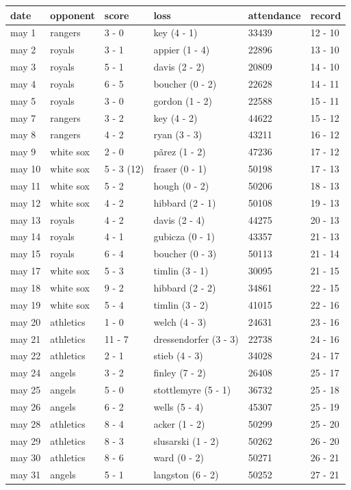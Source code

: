 \documentclass{article}
\begin{document}
\begin{tabular}{llllll}
\toprule
date & opponent & score & loss & attendance & record \\
\midrule
may 1 & rangers & 3 - 0 & key (4 - 1) & 33439 & 12 - 10 \\
may 2 & royals & 3 - 1 & appier (1 - 4) & 22896 & 13 - 10 \\
may 3 & royals & 5 - 1 & davis (2 - 2) & 20809 & 14 - 10 \\
may 4 & royals & 6 - 5 & boucher (0 - 2) & 22628 & 14 - 11 \\
may 5 & royals & 3 - 0 & gordon (1 - 2) & 22588 & 15 - 11 \\
may 7 & rangers & 3 - 2 & key (4 - 2) & 44622 & 15 - 12 \\
may 8 & rangers & 4 - 2 & ryan (3 - 3) & 43211 & 16 - 12 \\
may 9 & white sox & 2 - 0 & pãrez (1 - 2) & 47236 & 17 - 12 \\
may 10 & white sox & 5 - 3 (12) & fraser (0 - 1) & 50198 & 17 - 13 \\
may 11 & white sox & 5 - 2 & hough (0 - 2) & 50206 & 18 - 13 \\
may 12 & white sox & 4 - 2 & hibbard (2 - 1) & 50108 & 19 - 13 \\
may 13 & royals & 4 - 2 & davis (2 - 4) & 44275 & 20 - 13 \\
may 14 & royals & 4 - 1 & gubicza (0 - 1) & 43357 & 21 - 13 \\
may 15 & royals & 6 - 4 & boucher (0 - 3) & 50113 & 21 - 14 \\
may 17 & white sox & 5 - 3 & timlin (3 - 1) & 30095 & 21 - 15 \\
may 18 & white sox & 9 - 2 & hibbard (2 - 2) & 34861 & 22 - 15 \\
may 19 & white sox & 5 - 4 & timlin (3 - 2) & 41015 & 22 - 16 \\
may 20 & athletics & 1 - 0 & welch (4 - 3) & 24631 & 23 - 16 \\
may 21 & athletics & 11 - 7 & dressendorfer (3 - 3) & 22738 & 24 - 16 \\
may 22 & athletics & 2 - 1 & stieb (4 - 3) & 34028 & 24 - 17 \\
may 24 & angels & 3 - 2 & finley (7 - 2) & 26408 & 25 - 17 \\
may 25 & angels & 5 - 0 & stottlemyre (5 - 1) & 36732 & 25 - 18 \\
may 26 & angels & 6 - 2 & wells (5 - 4) & 45307 & 25 - 19 \\
may 28 & athletics & 8 - 4 & acker (1 - 2) & 50299 & 25 - 20 \\
may 29 & athletics & 8 - 3 & slusarski (1 - 2) & 50262 & 26 - 20 \\
may 30 & athletics & 8 - 6 & ward (0 - 2) & 50271 & 26 - 21 \\
may 31 & angels & 5 - 1 & langston (6 - 2) & 50252 & 27 - 21 \\
\bottomrule
\end{tabular}
\end{document}
